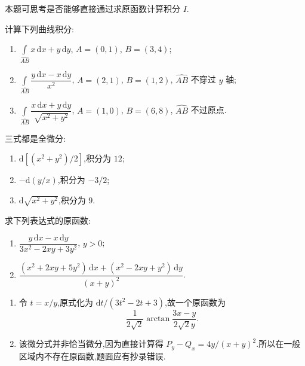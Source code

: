 \begin{remark}
    本题可思考是否能够直接通过求原函数计算积分 $I$.
\end{remark}

\begin{example}
    计算下列曲线积分:
    \begin{enumerate}
        \item $\displaystyle\int\limits_{\widehat{AB}}x\,\mathrm{d}x+y\,\mathrm{d}y$, $A=(0,1)$, $B=(3,4)$;
        \item $\displaystyle\int\limits_{\widehat{AB}}\dfrac{y\,\mathrm{d}x-x\,\mathrm{d}y}{x^2}$, $A=(2,1)$, $B=(1,2)$, $\widehat{AB}$ 不穿过 $y$ 轴;
        \item $\displaystyle\int\limits_{\widehat{AB}}\dfrac{x\,\mathrm{d}x+y\,\mathrm{d}y}{\sqrt{x^2+y^2}}$, $A=(1,0)$, $B=(6,8)$, $\widehat{AB}$ 不过原点.
    \end{enumerate}
\end{example}
\exampleblank

\begin{solution}
    三式都是全微分:
    \begin{enumerate}
        \item $\mathrm{d}[(x^2+y^2)/2]$,积分为 $12$;
        \item $-\mathrm{d}(y/x)$,积分为 $-3/2$;
        \item $\mathrm{d}\sqrt{x^2+y^2}$,积分为 $9$.
    \end{enumerate}
\end{solution}

\begin{example}
    求下列表达式的原函数:
    \begin{enumerate}
        \item $\displaystyle\dfrac{y\,\mathrm{d}x-x\,\mathrm{d}y}{3x^2-2xy+3y^2}$, $y>0$;
        \item $\displaystyle\dfrac{(x^2+2xy+5y^2)\,\mathrm{d}x+(x^2-2xy+y^2)\,\mathrm{d}y}{(x+y)^2}$.
    \end{enumerate}
\end{example}
\exampleblank

\begin{solution}
    \leavevmode
    \begin{enumerate}
        \item 令 $t=x/y$,原式化为 $\mathrm{d}t/(3t^2-2t+3)$,故一个原函数为
              \[
                  \dfrac{1}{2\sqrt{2}}\arctan\dfrac{3x-y}{2\sqrt{2}y}.
              \]
        \item 该微分式并非恰当微分,因为直接计算得 $P_y-Q_x=4y/(x+y)^2$.所以在一般区域内不存在原函数,题面应有抄录错误.
    \end{enumerate}
\end{solution}

